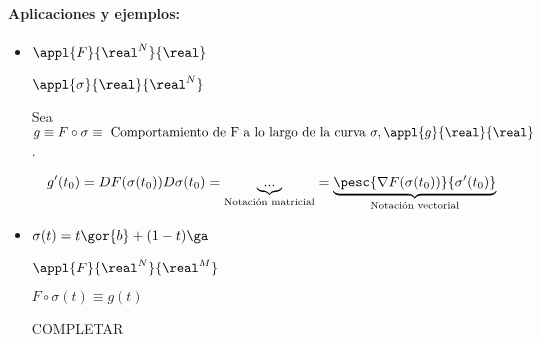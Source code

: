 \paragraph{Aplicaciones y ejemplos:}
\begin{itemize}
 \item 
 $\appl{F}{\real^N}{\real}$
 
 $\appl{\sigma}{\real}{\real^N}$
 
 Sea $g\equiv F\circ \sigma \equiv \text{ Comportamiento de F a lo largo de la curva } \sigma, \appl{g}{\real}{\real}$.

$$g'(t_0) = DF(\sigma(t_0))D\sigma(t_0) = \underbrace{...}_{\text{Notación matricial}} = \underbrace{\pesc{\nabla F(\sigma(t_0))}{\sigma'(t_0)}}_{\text{Notación vectorial}}$$

 
 \item 
 $\sigma(t) = t\gor{b} + (1-t)\ga$
 
 $\appl{F}{\real^N}{\real^M}$
 
 $F\circ \sigma(t) \equiv g(t)$
 
 COMPLETAR
\end{itemize}

